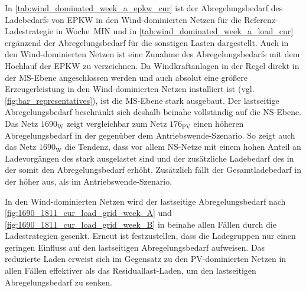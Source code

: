 In \autoref{tab:wind_dominated_week_a_epkw_cur} ist der Abregelungsbedarf des Ladebedarfs von \gls{EPKW} in den Wind-dominierten Netzen für die Referenz-Ladestrategie in Woche~MIN und in \autoref{tab:wind_dominated_week_a_load_cur} ergänzend der Abregelungsbedarf für die sonstigen Lasten dargestellt.
Auch in den Wind-dominierten Netzen ist eine Zunahme des Abregelungsbedarfs mit dem Hochlauf der \gls{EPKW} zu verzeichnen.
Da Windkraftanlagen in der Regel direkt in der \gls{MS}-Ebene angeschlossen werden und auch absolut eine größere Erzeugerleistung in den Wind-dominierten Netzen installiert ist (vgl. \autoref{fig:bar_representatives}), ist die \gls{MS}-Ebene stark ausgebaut.
Der lastseitige Abregelungsbedarf beschränkt sich deshalb beinahe vollständig auf die \gls{NS}-Ebene.
Das Netz \(1690_{\text{W}}\) zeigt vergleichbar zum Netz \(176_{\text{PV}}\) einen höheren Abregelungsbedarf in der \SzeFirmenparkplatz gegenüber dem Antriebswende-Szenario.
So zeigt auch das Netz \(1690_{\text{W}}\) die Tendenz, dass vor allem \gls{NS}-Netze mit einem hohen Anteil an Ladevorgängen des \UC \zH stark ausgelastet sind und der zusätzliche Ladebedarf des \UC \zH in der \SzeFirmenparkplatz somit den Abregelungsbedarf erhöht.
Zusätzlich fällt der Gesamtladebedarf in der \SzeFirmenparkplatz höher aus, als im Antriebswende-Szenario.





In den Wind-dominierten Netzen wird der lastseitige Abregelungsbedarf nach \autoref{fig:1690_1811_cur_load_grid_week_A} und \autoref{fig:1690_1811_cur_load_grid_week_B} in beinahe allen Fällen durch die Ladestrategien gesenkt.
Erneut ist festzustellen, dass die Ladegruppen nur einen geringen Einfluss auf den lastseitigen Abregelungsbedarf aufweisen.
Das reduzierte Laden erweist sich im Gegensatz zu den \gls{PV}-dominierten Netzen in allen Fällen effektiver als das Residuallast-Laden, um den lastseitigen Abregelungsbedarf zu senken.\medskip



